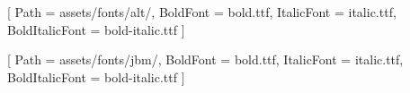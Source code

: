 \newfontfamily{}[
    Path = assets/fonts/alt/,
    BoldFont = bold.ttf,
    ItalicFont = italic.ttf,
    BoldItalicFont = bold-italic.ttf
]

\newfontfamily{}[
    Path = assets/fonts/jbm/,
    BoldFont = bold.ttf,
    ItalicFont = italic.ttf,
    BoldItalicFont = bold-italic.ttf
]

